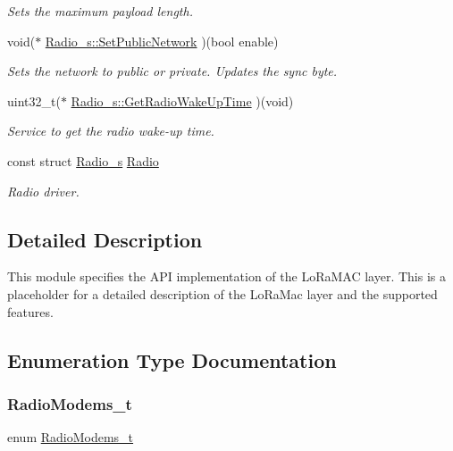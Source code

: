 \begin{DoxyCompactItemize}
\begin{DoxyCompactList}\small\item\em Sets the maximum payload length. \end{DoxyCompactList}\item 
void($\ast$ \hyperlink{group__LORA_ga33681fa99af4bf37517e1ba1107e1877}{Radio\+\_\+s\+::\+Set\+Public\+Network} )(bool enable)
\begin{DoxyCompactList}\small\item\em Sets the network to public or private. Updates the sync byte. \end{DoxyCompactList}\item 
uint32\+\_\+t($\ast$ \hyperlink{group__LORA_ga7396df7c609fbda8b6ed87755b3899be}{Radio\+\_\+s\+::\+Get\+Radio\+Wake\+Up\+Time} )(void)
\begin{DoxyCompactList}\small\item\em Service to get the radio wake-\/up time. \end{DoxyCompactList}\item 
const struct \hyperlink{structRadio__s}{Radio\+\_\+s} \hyperlink{group__LORA_gacf9fe61a72c16fa29a0dc449d23e3820}{Radio}
\begin{DoxyCompactList}\small\item\em Radio driver. \end{DoxyCompactList}\end{DoxyCompactItemize}


\subsection{Detailed Description}
This module specifies the A\+PI implementation of the Lo\+Ra\+M\+AC layer. This is a placeholder for a detailed description of the Lo\+Ra\+Mac layer and the supported features. 

\subsection{Enumeration Type Documentation}
\mbox{\label{group__LORA_ga992ef7a5b7f52975ba7bd8dd97740057}} 
\subsubsection{\texorpdfstring{Radio\+Modems\+\_\+t}{RadioModems\_t}}
{\footnotesize\ttfamily enum \hyperlink{group__LORA_ga992ef7a5b7f52975ba7bd8dd97740057}{Radio\+Modems\+\_\+t}}

